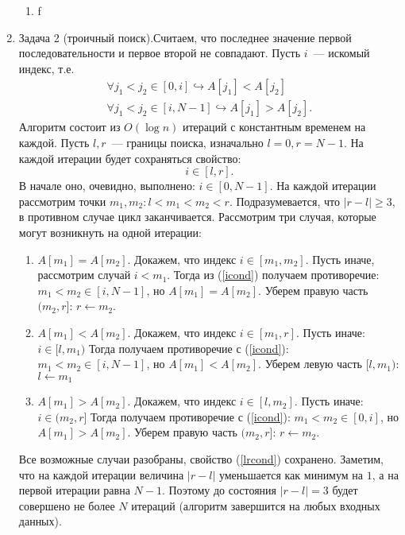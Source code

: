 \documentclass{article}
\begin{document}
\begin{enumerate}
\begin{enumerate}
\item f
\end{enumerate}
\item Задача 2 (троичный поиск).Считаем, что последнее значение первой последовательности и первое второй не совпадают. Пусть $i$~--- искомый индекс, т.е. \begin{equation}\begin{array}{lcr}\label{icond}\forall j_1<j_2\in[0,i]\hookrightarrow A[j_1]<A[j_2]\\
\forall j_1<j_2\in[i,N-1]\hookrightarrow A[j_1]>A[j_2].\end{array}\end{equation} Алгоритм состоит из $O(\log n)$ итераций с константным временем на каждой. Пусть $l,r$~--- границы поиска, изначально $l=0, r=N-1$. На каждой итерации будет сохраняться свойство: \begin{equation}\label{lrcond}i\in [l,r].\end{equation} В начале оно, очевидно, выполнено: $i\in[0,N-1]$. На каждой итерации рассмотрим точки $m_1,m_2:l<m_1<m_2<r$. Подразумевается, что $|r-l|\geq 3$, в противном случае цикл заканчивается.\newline
Рассмотрим три случая, которые могут возникнуть на одной итерации:
\begin{enumerate}
\item $A[m_1]=A[m_2]$. Докажем, что индекс $i\in[m_1,m_2]$. Пусть иначе, рассмотрим случай $i<m_1$. Тогда из (\ref{icond}) получаем противоречие: $m_1<m_2\in[i,N-1]$, но $A[m_1]=A[m_2]$.\newline
Уберем правую часть $(m_2,r]$: $r\leftarrow m_2$.
\item $A[m_1]<A[m_2]$. Докажем, что индекс $i\in[m_1,r]$. Пусть иначе: $i\in[l,m_1)$ Тогда получаем противоречие с (\ref{icond}): $m_1<m_2\in[i,N-1]$, но $A[m_1]<A[m_2]$.\newline
Уберем левую часть $[l,m_1)$: $l\leftarrow m_1$
\item $A[m_1]>A[m_2]$. Докажем, что индекс $i\in[l,m_2]$. Пусть иначе: $i\in(m_2,r]$ Тогда получаем противоречие с (\ref{icond}): $m_1<m_2\in[0,i]$, но $A[m_1]>A[m_2]$.\newline
Уберем правую часть $(m_2,r]$: $r\leftarrow m_2$.
\end{enumerate}
Все возможные случаи разобраны, свойство (\ref{lrcond}) сохранено.\newline
Заметим, что на каждой итерации величина $|r-l|$ уменьшается как минимум на $1$, а на первой итерации равна $N-1$. Поэтому до состояния $|r-l|=3$ будет совершено не более $N$ итераций (алгоритм завершится на любых входных данных).\newline

\end{enumerate}
\end{document}
